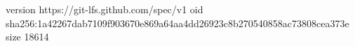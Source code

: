 version https://git-lfs.github.com/spec/v1
oid sha256:1a42267dab7109f903670e869a64aa4dd26923c8b270540858ac73808cea373e
size 18614
